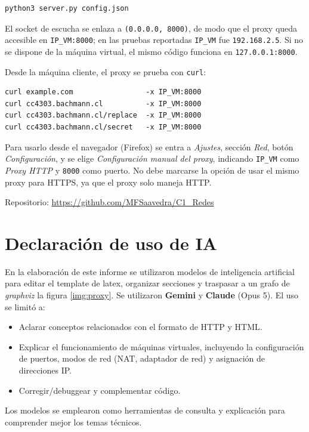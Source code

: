 \documentclass[
	spanish, %
	letterpaper, oneside
]{article}
\newcommand{\code}[1]{\texttt{#1}}    %
\begin{document}
\begin{verbatim}
python3 server.py config.json
\end{verbatim}

El socket de escucha se enlaza a \code{(0.0.0.0, 8000)}, de modo que el proxy queda accesible en \code{IP\_VM:8000}; en las pruebas reportadas \code{IP\_VM} fue \code{192.168.2.5}. Si no se dispone de la máquina virtual, el mismo código funciona en \code{127.0.0.1:8000}.

Desde la máquina cliente, el proxy se prueba con \code{curl}:

\begin{verbatim}
curl example.com                 -x IP_VM:8000
curl cc4303.bachmann.cl          -x IP_VM:8000
curl cc4303.bachmann.cl/replace  -x IP_VM:8000
curl cc4303.bachmann.cl/secret   -x IP_VM:8000
\end{verbatim}

Para usarlo desde el navegador (Firefox) se entra a \textit{Ajustes}, sección \textit{Red}, botón \textit{Configuración}, y se elige \textit{Configuración manual del proxy}, indicando \code{IP\_VM} como \textit{Proxy HTTP} y \code{8000} como puerto. No debe marcarse la opción de usar el mismo proxy para HTTPS, ya que el proxy solo maneja HTTP.

Repositorio: \url{https://github.com/MFSaavedra/C1_Redes}

\section{Declaración de uso de IA}
En la elaboración de este informe se utilizaron modelos de inteligencia artificial para editar el template de latex, organizar secciones y traspasar a un grafo de \textit{graphviz} la figura \ref{img:proxy}. Se utilizaron \textbf{Gemini} y \textbf{Claude} (Opus 5).
El uso se limitó a:
\begin{itemize}
	\item Aclarar conceptos relacionados con el formato de HTTP y HTML.
	\item Explicar el funcionamiento de máquinas virtuales, incluyendo la configuración de puertos, modos de red (NAT, adaptador de red) y asignación de direcciones IP.
	\item Corregir/debuggear y complementar código.
\end{itemize}

Los modelos se emplearon como herramientas de consulta y explicación para comprender mejor los temas técnicos.

\end{document}
